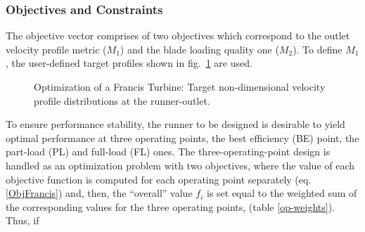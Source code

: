 
\subsubsection{Objectives and Constraints}
The objective vector comprises of two objectives which correspond to the outlet velocity profile metric ($M_1$) and the blade loading quality one ($M_2$). To define $M_1$, the user-defined target profiles shown in fig.\ \ref{design-obj-tar} are used. 



\begin{figure}[h!]
\begin{minipage}[b]{1\linewidth}
 \centering
\end{minipage}
\caption{Optimization of a Francis Turbine: Target non-dimensional velocity profile distributions at the runner-outlet.}
\label{design-obj-tar}
\end{figure}


To ensure performance stability, the runner to be designed is desirable to yield optimal performance at three operating points, the best efficiency (BE) point, the part-load (PL) and full-load (FL) ones. %
The three-operating-point design is handled as an optimization problem with two objectives, where the value of each objective function is computed for each operating point separately (eq. \ref{ObjFrancis}) and, then, the “overall” value $f_i$ is set equal to the weighted sum of the corresponding values for the three operating points, (table \ref{op-weights}). Thus, if


